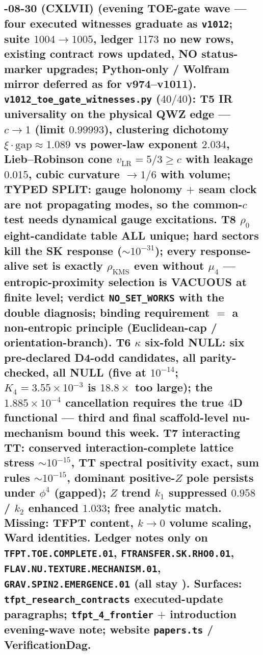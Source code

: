 \subsection*{-08-30 (CXLVII) (evening TOE-gate wave --- four executed witnesses graduate as \texttt{v1012}; suite $1004 \to 1005$, ledger $1173$ no new rows, existing contract rows updated, NO status-marker upgrades; Python-only / Wolfram mirror deferred as for v974--v1011).  \texttt{v1012\_\allowbreak toe\_\allowbreak gate\_\allowbreak witnesses.py} ($40/40$): T5 IR universality on the physical QWZ edge --- $c\to1$ (limit $0.99993$), clustering dichotomy $\xi{\cdot}\mathrm{gap}\approx1.089$ vs power-law exponent $2.034$, Lieb--Robinson cone $v_{\mathrm{LR}}=5/3\ge c$ with leakage $0.015$, cubic curvature $\to1/6$ with volume; TYPED SPLIT: gauge holonomy $+$ seam clock are not propagating modes, so the common-$c$ test needs dynamical gauge excitations.  T8 $\rho_0$ eight-candidate table ALL unique; hard sectors kill the SK response ($\sim10^{-31}$); every response-alive set is exactly $\rho_{\mathrm{KMS}}$ even without $\mu_4$ --- entropic-proximity selection is VACUOUS at finite level; verdict \texttt{NO\_SET\_WORKS} with the double diagnosis; binding requirement $=$ a non-entropic principle (Euclidean-cap / orientation-branch).  T6 $\kappa$ six-fold NULL: six pre-declared D4-odd candidates, all parity-checked, all NULL (five at $10^{-14}$; $K_4=3.55{\times}10^{-3}$ is $18.8{\times}$ too large); the $1.885{\times}10^{-4}$ cancellation requires the true $4$D functional --- third and final scaffold-level nu-mechanism bound this week.  T7 interacting TT: conserved interaction-complete lattice stress $\sim10^{-15}$, TT spectral positivity exact, sum rules $\sim10^{-15}$, dominant positive-$Z$ pole persists under $\phi^4$ (gapped); $Z$ trend $k_1$ suppressed $0.958$ / $k_2$ enhanced $1.033$; free analytic match.  Missing: TFPT content, $k\to0$ volume scaling, Ward identities.  Ledger notes only on \texttt{TFPT.TOE.COMPLETE.01}, \texttt{FTRANSFER.SK.RHO0.01}, \texttt{FLAV.NU.TEXTURE.MECHANISM.01}, \texttt{GRAV.SPIN2.EMERGENCE.01} (all stay \mO).  Surfaces: \texttt{tfpt\_research\_contracts} executed-update paragraphs; \texttt{tfpt\_4\_frontier} $+$ introduction evening-wave note; website \texttt{papers.ts} / VerificationDag.}

